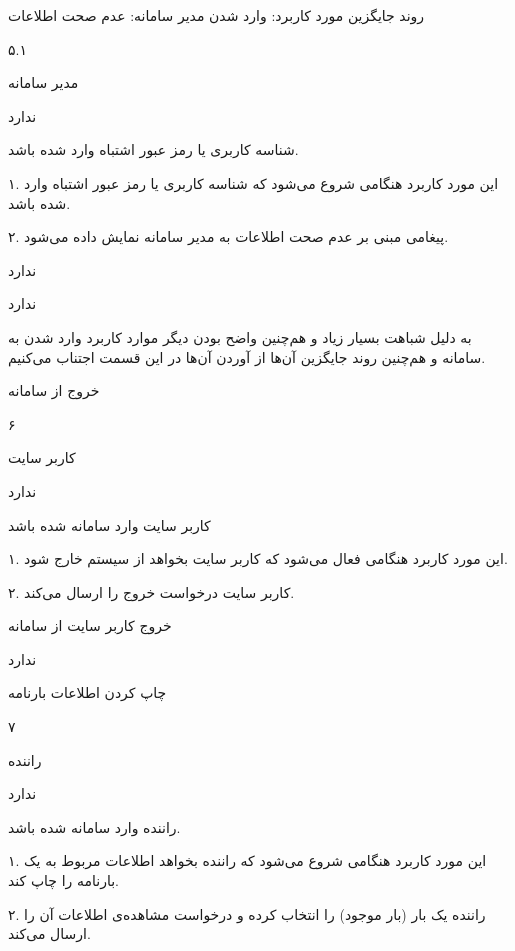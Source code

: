 روند جایگزین مورد کاربرد: وارد شدن مدیر سامانه: عدم صحت اطلاعات

۵.۱

مدیر سامانه

ندارد

شناسه کاربری یا رمز عبور اشتباه وارد شده باشد.


۱. این مورد کاربرد هنگامی شروع می‌شود که شناسه کاربری یا رمز عبور اشتباه وارد شده باشد.

۲. پیغامی مبنی بر عدم صحت اطلاعات به مدیر سامانه نمایش داده می‌شود.

ندارد

ندارد

 به دلیل شباهت بسیار زیاد و هم‌چنین واضح بودن دیگر موارد کاربرد وارد شدن به سامانه و هم‌چنین روند جایگزین آن‌ها از آوردن آن‌ها در این قسمت اجتناب می‌کنیم.

\newpage

خروج از سامانه

۶

کاربر سایت

ندارد

کاربر سایت وارد سامانه شده باشد


۱. این مورد کاربرد هنگامی فعال می‌شود که کاربر سایت بخواهد از سیستم خارج شود.

۲. کاربر سایت درخواست خروج را ارسال می‌کند.

خروج کاربر سایت از سامانه 

ندارد

\newpage

چاپ کردن اطلاعات بارنامه

۷

راننده

ندارد

راننده وارد سامانه شده باشد.


۱. این مورد کاربرد هنگامی شروع می‌شود که راننده بخواهد اطلاعات مربوط به یک بارنامه را چاپ کند. 

۲. راننده یک بار (بار موجود) را انتخاب کرده و درخواست مشاهده‌ی اطلاعات آن را ارسال می‌کند.

